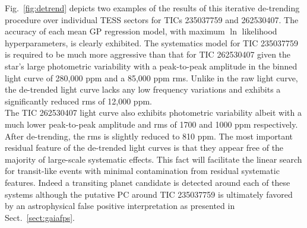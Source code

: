 

Fig.~\ref{fig:detrend} depicts two examples of the results of this iterative de-trending procedure over
individual TESS sectors for TICs 235037759 and 262530407. The accuracy of each mean GP regression model,
with maximum $\ln$ likelihood hyperparameters, is clearly exhibited. The systematics model for TIC 235037759
is required to be much more aggressive than that for TIC 262530407
given the star's large photometric variability with a peak-to-peak
amplitude in the binned light curve of 280,000 ppm and a 85,000 ppm rms. Unlike in the raw
light curve, the de-trended light curve lacks any low frequency variations and exhibits a significantly
reduced rms of 12,000 ppm. \\

The TIC 262530407 light curve also exhibits photometric variability albeit with a much lower peak-to-peak
amplitude and rms of 1700 and 1000 ppm respectively. After de-trending, the rms is slightly reduced to 
810 ppm. The most important residual feature of the de-trended light curves is that they appear free
of the majority of large-scale systematic effects. This fact will facilitate the linear search for
transit-like events with minimal contamination from residual systematic features. Indeed 
a transiting planet candidate is detected
around each of these systems although the putative PC around TIC 235037759
is ultimately favored by an astrophysical false positive interpretation as presented in
Sect.~\ref{sect:gaiafps}. \\

